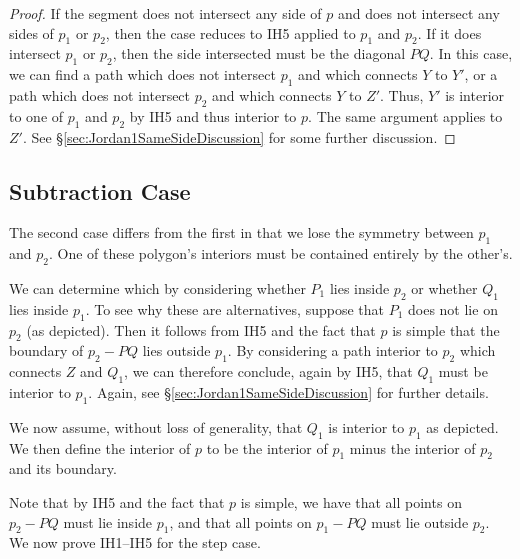 \begin{description}
\begin{proof}
    If the segment does not intersect any side of $p$ and does not intersect any sides of $p_1$ or $p_2$, then the case reduces to IH5 applied to $p_1$ and $p_2$. If it does intersect $p_1$ or $p_2$, then the side intersected must be the diagonal $PQ$. In this case, we can find a path which does not intersect $p_1$ and which connects $Y$ to $Y'$, or a path which does not intersect $p_2$ and which connects $Y$ to $Z'$. Thus, $Y'$ is interior to one of $p_1$ and $p_2$ by IH5 and thus interior to $p$. The same argument applies to $Z'$. See \S\ref{sec:Jordan1SameSideDiscussion} for some further discussion. %
  \end{proof}
\end{description}

\subsection{Subtraction Case}
The second case differs from the first in that we lose the symmetry between $p_1$ and $p_2$. One of these polygon's interiors must be contained entirely by the other's. 

We can determine which by considering whether $P_1$ lies inside $p_2$ or whether $Q_1$ lies inside $p_1$. To see why these are alternatives, suppose that $P_1$ does not lie on $p_2$ (as depicted). Then it follows from IH5 and the fact that $p$ is simple that the boundary of $p_2 - PQ$ lies outside $p_1$. By considering a path interior to $p_2$ which connects $Z$ and $Q_1$, we can therefore conclude, again by IH5, that $Q_1$ must be interior to $p_1$. Again, see \S\ref{sec:Jordan1SameSideDiscussion} for further details.

We now assume, without loss of generality, that $Q_1$ is interior to $p_1$ as depicted. We then define the interior of $p$ to be the interior of $p_1$ minus the interior of $p_2$ and its boundary. 

Note that by IH5 and the fact that $p$ is simple, we have that all points on $p_2 - PQ$ must lie inside $p_1$, and that all points on $p_1 - PQ$ must lie outside $p_2$. We now prove IH1--IH5 for the step case.

